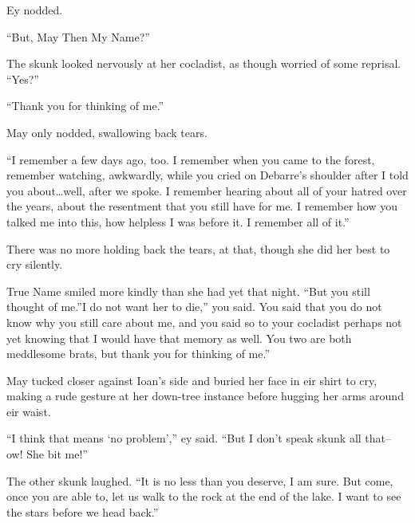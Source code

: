 Ey nodded.

``But, May Then My Name?''

The skunk looked nervously at her cocladist, as though worried of some reprisal. ``Yes?''

``Thank you for thinking of me.''

May only nodded, swallowing back tears.

``I remember a few days ago, too. I remember when you came to the forest, remember watching, awkwardly, while you cried on Debarre's shoulder after I told you about\ldots well, after we spoke. I remember hearing about all of your hatred over the years, about the resentment that you still have for me. I remember how you talked me into this, how helpless I was before it. I remember all of it.''

There was no more holding back the tears, at that, though she did her best to cry silently.

True Name smiled more kindly than she had yet that night. ``But you still thought of me.''I do not want her to die,'' you said. You said that you do not know why you still care about me, and you said so to your cocladist perhaps not yet knowing that I would have that memory as well. You two are both meddlesome brats, but thank you for thinking of me.''

May tucked closer against Ioan's side and buried her face in eir shirt to cry, making a rude gesture at her down-tree instance before hugging her arms around eir waist.

``I think that means `no problem','' ey said. ``But I don't speak skunk all that-- ow! She bit me!''

The other skunk laughed. ``It is no less than you deserve, I am sure. But come, once you are able to, let us walk to the rock at the end of the lake. I want to see the stars before we head back.''
